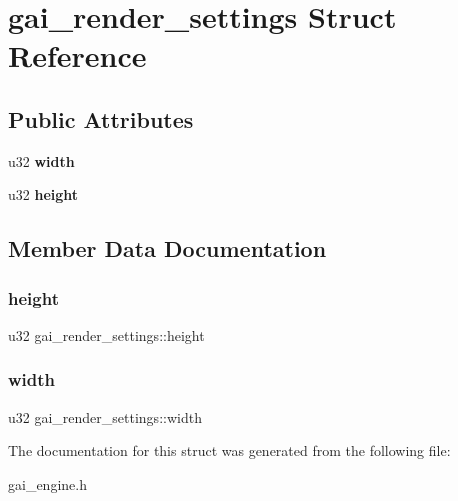 \hypertarget{structgai__render__settings}{}\section{gai\+\_\+render\+\_\+settings Struct Reference}
\label{structgai__render__settings}
\subsection*{Public Attributes}
\begin{DoxyCompactItemize}
\item 
\mbox{\label{structgai__render__settings_a94158f4aeba7ee4619d7ef64fe882b79}} 
u32 {\bfseries width}
\item 
\mbox{\label{structgai__render__settings_a646f141e340397c5a7d51f2c448f8bc6}} 
u32 {\bfseries height}
\end{DoxyCompactItemize}


\subsection{Member Data Documentation}
\mbox{\label{structgai__render__settings_a646f141e340397c5a7d51f2c448f8bc6}} 
\subsubsection{\texorpdfstring{height}{height}}
{\footnotesize\ttfamily u32 gai\+\_\+render\+\_\+settings\+::height}

\mbox{\label{structgai__render__settings_a94158f4aeba7ee4619d7ef64fe882b79}} 
\subsubsection{\texorpdfstring{width}{width}}
{\footnotesize\ttfamily u32 gai\+\_\+render\+\_\+settings\+::width}



The documentation for this struct was generated from the following file\+:\begin{DoxyCompactItemize}
\item 
gai\+\_\+engine.\+h\end{DoxyCompactItemize}
